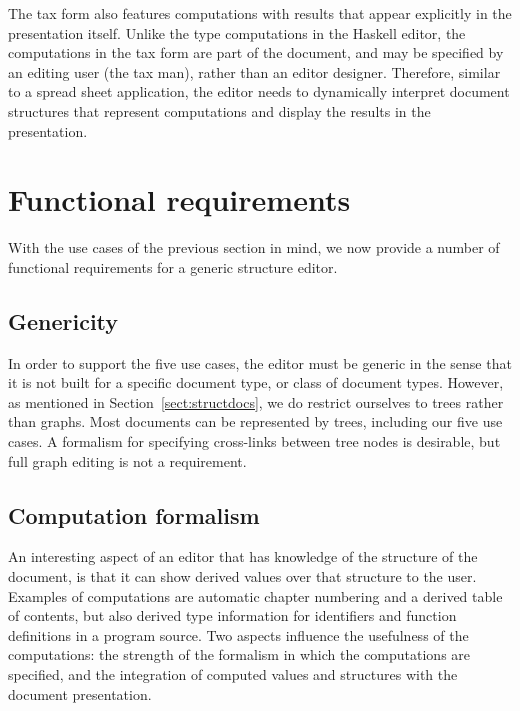 The tax form also features computations with results that appear explicitly in the presentation itself. Unlike the type computations in the Haskell editor, the computations in the tax form are part of the document, and may be specified by an editing user (the tax man), rather than an editor designer. Therefore, similar to a spread sheet application, the editor needs to dynamically interpret document structures that represent computations and display the results in the presentation. 

%																
%																
%																
\section{Functional requirements}
\label{sect:reqs}
With the use cases of the previous section in mind, we now provide a number of functional requirements for a generic structure editor. 


%																
\subsection{Genericity}

In order to support the five use cases, the editor must be generic in the sense that it is not built for a specific document type, or class of document types. However, as mentioned in Section~\ref{sect:structdocs}, we do restrict ourselves to trees rather than graphs. Most documents can be represented by trees, including our five use cases. A formalism for specifying cross-links between tree nodes is desirable, but full graph editing is not a requirement.



%																
\subsection{Computation formalism}

An interesting aspect of an editor that has knowledge of the structure of the document, is that it can show derived values over that structure to the user. Examples of computations are automatic chapter numbering and a derived table of contents, but also derived type information for identifiers and function definitions in a program source. Two aspects influence the usefulness of the computations: the strength of the formalism in which the computations are specified, and the integration of computed values and structures with the document presentation.

